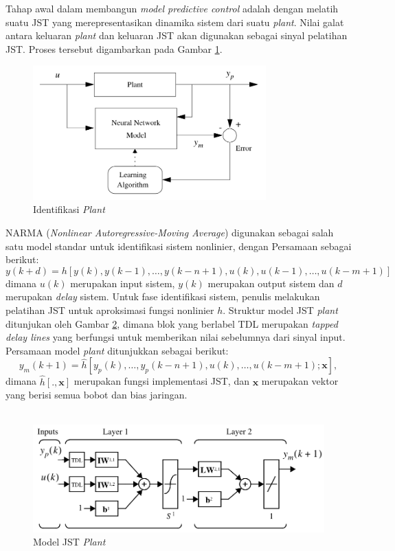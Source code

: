 Tahap awal dalam membangun \textit{model predictive control} adalah dengan melatih suatu JST yang merepresentasikan dinamika sistem dari suatu \textit{plant}. Nilai galat antara keluaran \textit{plant} dan keluaran JST akan digunakan sebagai sinyal pelatihan JST. Proses tersebut digambarkan pada Gambar \ref{fig:3:plantidentification}.
\begin{figure}[!h]
	\centering
	\includegraphics[width=0.8\textwidth]{figures/PlantIdentification}
	\caption{Identifikasi \textit{Plant}}
	\label{fig:3:plantidentification}
\end{figure}

NARMA (\textit{Nonlinear Autoregressive-Moving Average}) digunakan sebagai salah satu model standar untuk identifikasi sistem nonlinier, dengan Persamaan sebagai berikut:
\begin{equation} \label{eq:3:NARMA}
y(k+d) = h[ y(k),y(k-1),\dots,y(k-n+1),u(k),u(k-1),\dots,u(k-m+1) ]
\end{equation}
dimana $u(k)$ merupakan input sistem, $y(k)$ merupakan output sistem dan $d$ merupakan \textit{delay} sistem. Untuk fase identifikasi sistem, penulis melakukan pelatihan JST untuk aproksimasi fungsi nonlinier $h$. Struktur model JST \textit{plant} ditunjukan oleh Gambar \ref{fig:3:NNPlantModel}, dimana blok yang berlabel TDL merupakan \textit{tapped delay lines} yang berfungsi untuk memberikan nilai sebelumnya dari sinyal input. Persamaan model \textit{plant} ditunjukkan sebagai berikut:
\begin{equation} \label{eq:3:plantmodel}
y_m(k+1) = \hat{h}[ y_p(k),\dots,y_p(k-n+1),u(k),\dots,u(k-m+1);\textbf{x} ] ,
\end{equation}
dimana $\hat{h}[.,\textbf{x}]$ merupakan fungsi implementasi JST, dan $\textbf{x} $ merupakan vektor yang berisi semua bobot dan bias jaringan. \\ \\

\begin{figure}[!h]
	\centering
	\includegraphics[width=1\textwidth]{figures/modelJSTPlant}
	\caption{Model JST \textit{Plant}}
	\label{fig:3:NNPlantModel}
\end{figure}


